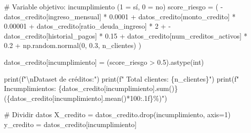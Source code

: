\documentclass[
  doc,
  floatsintext,
  longtable,
  a4paper,
  nolmodern,
  notxfonts,
  notimes,
  12pt,
  colorlinks=true,linkcolor=blue,citecolor=blue,urlcolor=blue]{apa7}
\newenvironment{Shaded}{\begin{snugshade}}{\end{snugshade}}
\newcommand{\BuiltInTok}[1]{\textcolor[rgb]{0.00,0.23,0.31}{#1}}
\newcommand{\CharTok}[1]{\textcolor[rgb]{0.13,0.47,0.30}{#1}}
\newcommand{\CommentTok}[1]{\textcolor[rgb]{0.37,0.37,0.37}{#1}}
\newcommand{\DecValTok}[1]{\textcolor[rgb]{0.68,0.00,0.00}{#1}}
\newcommand{\FloatTok}[1]{\textcolor[rgb]{0.68,0.00,0.00}{#1}}
\newcommand{\NormalTok}[1]{\textcolor[rgb]{0.00,0.23,0.31}{#1}}
\newcommand{\OperatorTok}[1]{\textcolor[rgb]{0.37,0.37,0.37}{#1}}
\newcommand{\SpecialCharTok}[1]{\textcolor[rgb]{0.37,0.37,0.37}{#1}}
\newcommand{\SpecialStringTok}[1]{\textcolor[rgb]{0.13,0.47,0.30}{#1}}
\newcommand{\StringTok}[1]{\textcolor[rgb]{0.13,0.47,0.30}{#1}}
\begin{document}
\begin{Shaded}
\begin{Highlighting}[]
\CommentTok{\# Variable objetivo: incumplimiento (1 = sí, 0 = no)}
\NormalTok{score\_riesgo }\OperatorTok{=}\NormalTok{ (}
    \OperatorTok{{-}}\NormalTok{datos\_credito[}\StringTok{\textquotesingle{}ingreso\_mensual\textquotesingle{}}\NormalTok{] }\OperatorTok{*} \FloatTok{0.0001} \OperatorTok{+}
\NormalTok{    datos\_credito[}\StringTok{\textquotesingle{}monto\_credito\textquotesingle{}}\NormalTok{] }\OperatorTok{*} \FloatTok{0.00001} \OperatorTok{+}
\NormalTok{    datos\_credito[}\StringTok{\textquotesingle{}ratio\_deuda\_ingreso\textquotesingle{}}\NormalTok{] }\OperatorTok{*} \DecValTok{2} \OperatorTok{+}
    \OperatorTok{{-}}\NormalTok{datos\_credito[}\StringTok{\textquotesingle{}historial\_pagos\textquotesingle{}}\NormalTok{] }\OperatorTok{*} \FloatTok{0.15} \OperatorTok{+}
\NormalTok{    datos\_credito[}\StringTok{\textquotesingle{}num\_creditos\_activos\textquotesingle{}}\NormalTok{] }\OperatorTok{*} \FloatTok{0.2} \OperatorTok{+}
\NormalTok{    np.random.normal(}\DecValTok{0}\NormalTok{, }\FloatTok{0.3}\NormalTok{, n\_clientes)}
\NormalTok{)}

\NormalTok{datos\_credito[}\StringTok{\textquotesingle{}incumplimiento\textquotesingle{}}\NormalTok{] }\OperatorTok{=}\NormalTok{ (score\_riesgo }\OperatorTok{\textgreater{}} \FloatTok{0.5}\NormalTok{).astype(}\BuiltInTok{int}\NormalTok{)}

\BuiltInTok{print}\NormalTok{(}\SpecialStringTok{f"}\CharTok{\textbackslash{}n}\SpecialStringTok{Dataset de créditos:"}\NormalTok{)}
\BuiltInTok{print}\NormalTok{(}\SpecialStringTok{f"  Total clientes: }\SpecialCharTok{\{}\NormalTok{n\_clientes}\SpecialCharTok{\}}\SpecialStringTok{"}\NormalTok{)}
\BuiltInTok{print}\NormalTok{(}\SpecialStringTok{f"  Incumplimientos: }\SpecialCharTok{\{}\NormalTok{datos\_credito[}\StringTok{\textquotesingle{}incumplimiento\textquotesingle{}}\NormalTok{]}\SpecialCharTok{.}\BuiltInTok{sum}\NormalTok{()}\SpecialCharTok{\}}\SpecialStringTok{ (}\SpecialCharTok{\{}\NormalTok{datos\_credito[}\StringTok{\textquotesingle{}incumplimiento\textquotesingle{}}\NormalTok{]}\SpecialCharTok{.}\NormalTok{mean()}\OperatorTok{*}\DecValTok{100}\SpecialCharTok{:.1f\}}\SpecialStringTok{\%)"}\NormalTok{)}

\CommentTok{\# Dividir datos}
\NormalTok{X\_credito }\OperatorTok{=}\NormalTok{ datos\_credito.drop(}\StringTok{\textquotesingle{}incumplimiento\textquotesingle{}}\NormalTok{, axis}\OperatorTok{=}\DecValTok{1}\NormalTok{)}
\NormalTok{y\_credito }\OperatorTok{=}\NormalTok{ datos\_credito[}\StringTok{\textquotesingle{}incumplimiento\textquotesingle{}}\NormalTok{]}


\end{Highlighting}
\end{Shaded}
\end{document}
